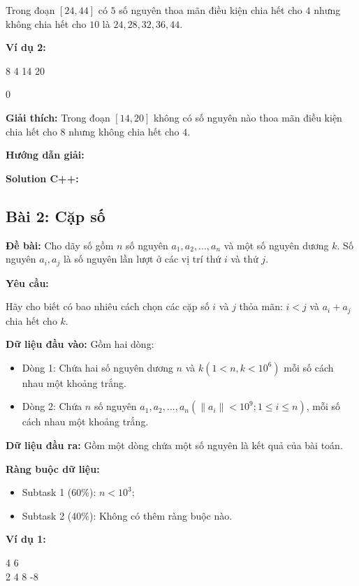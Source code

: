 \documentclass[12pt]{scrartcl}  %
\begin{document}
Trong đoạn $[24, 44]$ có $5$ số nguyên thoa mãn điều kiện chia hết cho $4$ nhưng không chia hết cho $10$ là $24, 28, 32, 36, 44$.

\textbf{Ví dụ 2:}
\begin{tcolorbox}[colback=gray!5!white, colframe=blue!50!black, title=Input]
8 4 14 20
\end{tcolorbox}
\begin{tcolorbox}[colback=gray!5!white, colframe=green!50!black, title=Output]
0
\end{tcolorbox}

\textbf{Giải thích:}
Trong đoạn $[14, 20]$ không có số nguyên nào thoa mãn điều kiện chia hết cho $8$ nhưng không chia hết cho $4$.

\textbf{Hướng dẫn giải:}

\textbf{Solution C++:}

\subsection{Bài 2: Cặp số}
\textbf{Đề bài:}
Cho dãy số gồm $n$ số nguyên $a_1, a_2, ... , a_n$ và một số nguyên dương $k$. Số nguyên $a_i, a_j$ là số nguyên lần lượt ở các vị trí thứ $i$ và thứ $j$.

\textbf{Yêu cầu:}

Hãy cho biết có bao nhiêu cách chọn các cặp số $i$ và $j$ thỏa mãn: $i < j$ và $a_i + a_j$ chia hết cho $k$. 

\textbf{Dữ liệu đầu vào:}
Gồm hai dòng:
\begin{itemize}
    \item Dòng 1: Chứa hai số nguyên dương $n$ và $k (1 < n, k < 10^6)$ mỗi số cách nhau một khoảng trắng.
    \item Dòng 2: Chứa $n$ số nguyên $a_1, a_2, ... , a_n (\| a_i \| < 10^9; 1 \leq i \leq n)$, mỗi số cách nhau một khoảng trắng.
\end{itemize}

\textbf{Dữ liệu đầu ra:}
Gồm một dòng chứa một số nguyên là kết quả của bài toán.

\textbf{Ràng buộc dữ liệu:}

\begin{itemize}
    \item Subtask 1 (60\%): $n < 10^3$;
    \item Subtask 2 (40\%): Không có thêm ràng buộc nào.
\end{itemize}

\textbf{Ví dụ 1:}
\begin{tcolorbox}[colback=gray!5!white, colframe=blue!50!black, title=Input]
4 6\\
2 4 8 -8
\end{tcolorbox}
\end{document}
